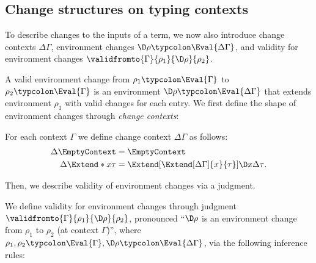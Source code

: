 \subsection{Change structures on typing contexts}
To describe changes to the inputs of a term, we now also introduce change
contexts \ensuremath{\Delta \Gamma}, environment changes \ensuremath{\D\rho\typcolon\Eval{\Delta \Gamma}}, and validity
for environment changes \ensuremath{\validfromto{\Gamma}{\rho_{1}}{\D\rho}{\rho_{2}}}.

A valid environment change from \ensuremath{\rho_{1}\typcolon\Eval{\Gamma}} to \ensuremath{\rho_{2}\typcolon\Eval{\Gamma}} is an environment \ensuremath{\D\rho\typcolon\Eval{\Delta \Gamma}} that
extends environment \ensuremath{\rho_{1}} with valid changes for each entry. We
first define the shape of environment changes through
\emph{change contexts}:

\begin{definition}
  \label{def:change-contexts}
  For each context \ensuremath{\Gamma} we define change context \ensuremath{\Delta \Gamma} as
  follows:
\begin{align*}
  \Delta\EmptyContext &= \EmptyContext \\
  \Delta\Extend*{x}{\tau} &= \Extend[\Extend[\Delta\Gamma]{x}{\tau}]{\D x}{\Delta\tau}\text{.}
\end{align*}
\end{definition}

Then, we describe validity of environment changes via a judgment.
\begin{definition}
  \label{def:env-ch-validity}
  We define validity for environment changes through judgment \ensuremath{\validfromto{\Gamma}{\rho_{1}}{\D\rho}{\rho_{2}}}, pronounced ``\ensuremath{\D\rho} is an environment change from \ensuremath{\rho_{1}} to \ensuremath{\rho_{2}}
  (at context \ensuremath{\Gamma})'', where \ensuremath{\rho_{1},\rho_{2}\typcolon\Eval{\Gamma},\D\rho\typcolon\Eval{\Delta \Gamma}}, via the following inference rules:
\begin{typing}
  \Axiom
  {\validfromto{\EmptyContext}{\EmptyEnv}{\EmptyEnv}{\EmptyEnv}}

\end{typing}
\end{definition}

